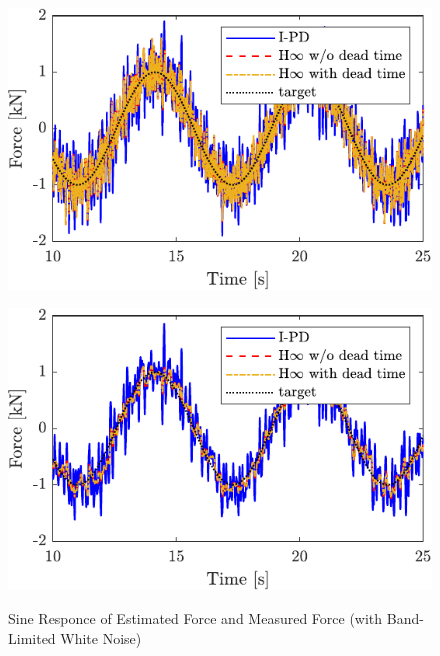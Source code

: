 \begin{figure}[t]
    \begin{minipage}{\minipageratio\hsize}
    \centering
        \includegraphics[keepaspectratio, scale = \minifigscale]{contents/ForceControl/figure/1115/crop-1115_diffnoise_estforce_sin.pdf}
        \label{fig4:crop-1115_diffnoise_estforce_sin}
    \end{minipage} 
    \begin{minipage}{\minipageratio\hsize}
    \centering
        \includegraphics[keepaspectratio, scale = \minifigscale]{contents/ForceControl/figure/1115/crop-1115_diffnoise_force_sin.pdf}
        \label{fig4:crop-1115_diffnoise_force_sin}
    \end{minipage}
    \caption{Sine Responce of Estimated Force and Measured Force (with Band-Limited White Noise)}
    \label{fig4:crop-1115_diffnoise_sin}
\end{figure}